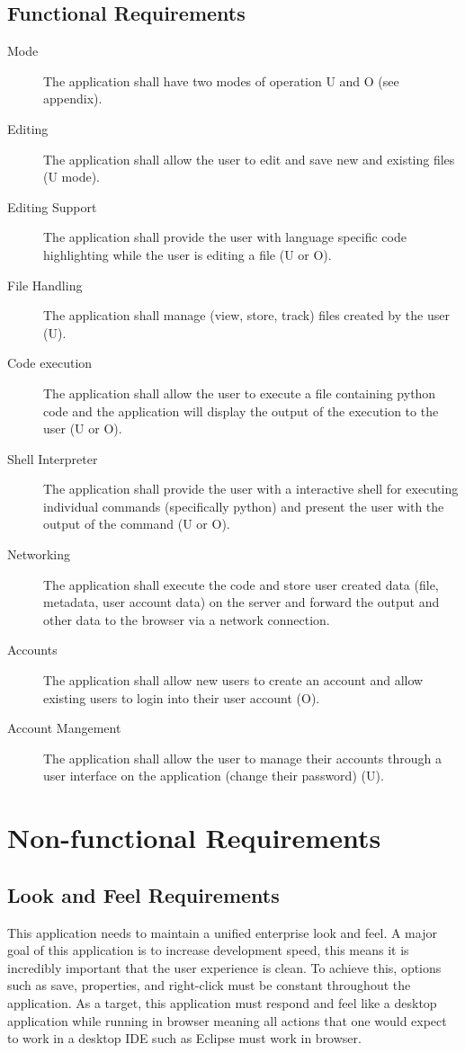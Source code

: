 \documentclass[12pt, titlepage]{article}
\begin{document}
  \subsection{Functional Requirements}
	\begin{description}
		\item [Mode] The application shall have two modes of operation U and O (see
			appendix).
		\item [Editing] The application shall allow the user to edit and
			save new and existing files (U mode).
    \item [Editing Support] The application shall provide the user with
      language specific code highlighting while the user is editing a file (U
      or O).
		\item [File Handling] The application shall manage (view, store, track)
			files created by the user (U).
		\item [Code execution] The application shall allow the user to execute a
			file containing python code and the application will display the output
			of the execution to the user (U or O).
		\item [Shell Interpreter] The application shall provide the user with a
			interactive shell for executing individual commands (specifically python)
			and present the user with the output of the command (U or O).
		\item [Networking] The application shall execute the code and store user
			created data (file, metadata, user account data) on the server and
			forward the output and other data to the browser via a network
			connection.
		\item [Accounts] The application shall allow new users to create an account
			and allow existing users to login into their user account (O).
		\item [Account Mangement] The application shall allow the user to manage
      their accounts through a user interface on the application (change their
      password) (U).
	\end{description}

\section{Non-functional Requirements}

  \subsection{Look and Feel Requirements}
	This application needs to maintain a unified enterprise look and feel. A
	major goal of this application is to increase development speed, this means
	it is incredibly important that the user experience is clean. To achieve
	this, options such as save, properties, and right-click must be constant
	throughout the application. As a target, this application must respond and
	feel like a desktop application while running in browser meaning all actions
	that one would expect to work in a desktop IDE such as Eclipse must work in
	browser.
\end{document}
